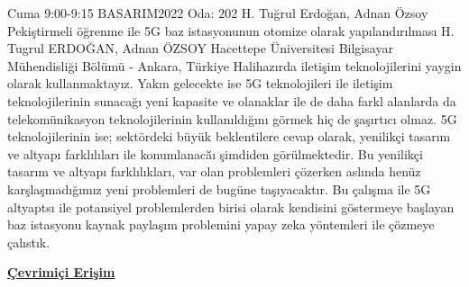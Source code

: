 
    \begin{abstract_basarim}
    {Cuma 9:00-9:15}
    {BASARIM2022}
    {Oda: 202}
    {H. Tuğrul Erdoğan, Adnan Özsoy}
    {Pekiştirmeli öğrenme ile 5G baz istasyonunun otomize olarak yapılandırılması}
    {%
    H. Tugrul ERDOĞAN, Adnan ÖZSOY}
    {%
    }
    {%
    Hacettepe Üniversitesi Bilgisayar Mühendisliği Bölümü - Ankara, Türkiye}
    Halihazırda iletişim teknolojilerini yaygin olarak kullanmaktayız. Yakın gelecekte ise 5G teknolojileri ile iletişim teknolojilerinin sunacağı yeni kapasite ve olanaklar ile de daha farkl alanlarda da telekomünikasyon teknolojilerinin kullanıldığını görmek hiç de şaşırtıcı olmaz. 5G teknolojilerinin ise; sektördeki büyük beklentilere cevap olarak, yenilikçi tasarım ve altyapı farklılıları ile konumlanacă̆ı şimdiden görülmektedir. Bu yenilikçi tasarım ve altyapı farklılıkları, var olan problemleri çözerken aslında henüz karşlaşmadığımız yeni problemleri de bugüne taşıyacaktır. Bu çalışma ile 5G altyaptsı ile potansiyel problemlerden birisi olarak kendisini göstermeye başlayan baz istasyonu kaynak paylaşım problemini yapay zeka yöntemleri ile çözmeye çalıstık. 
    
     \newline\newline\noindent \href{https://drive.google.com/file/d/16QuGSE00RtJch8gNm9T0chTn0ngW98mT/view?usp=drivesdk}{\bfseries Çevrimiçi Erişim}
    \end{abstract_basarim}
    